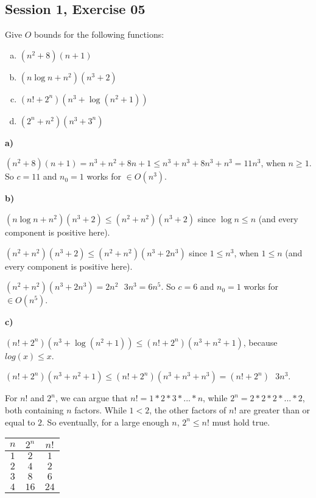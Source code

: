 \subsection{Session 1, Exercise 05}


Give $O$ bounds for the following functions:

\begin{enumerate}[a.)]
    \item $(n^2+8)(n+1)$
    \item $(n\log{n} + n^2)(n^3+2)$
    \item $(n!+2^n)(n^3+\log(n^2+1))$
    \item $(2^n+n^2)(n^3+3^n)$
\end{enumerate}


\textbf{a)}

$(n^2+8)(n+1) = n^3+n^2+8n+1 \leq{} n^3 + n^3 + 8n^3 + n^3 = 11n^3$, when $n\geq{}1$. So $c=11$ and $n_0=1$ works for $\in{}O(n^3)$.

\textbf{b)}

$(n\log{n} + n^2)(n^3+2) \leq{} (n^2 + n^2)(n^3+2)$ since $\log{n} \leq{} n$ (and every component is positive here).

$(n^2 + n^2)(n^3+2) \leq{} (n^2 + n^2)(n^3+2n^3)$ since $1 \leq{} n^3$, when $1 \leq{} n$ (and every component is positive here).

$(n^2 + n^2)(n^3+2n^3) = 2n^2\text{ }3n^3 = 6n^5$. So $c=6$ and $n_0=1$ works for $\in{}O(n^5)$.

\textbf{c)}

$(n!+2^n)(n^3+\log(n^2+1)) \leq{} (n!+2^n)(n^3+n^2+1)$, because $log(x) \leq{} x$.

$(n!+2^n)(n^3+n^2+1) \leq{} (n!+2^n)(n^3+n^3+n^3) = (n!+2^n)\text{ }3n^3$.

For $n!$ and $2^n$, we can argue that $n! = 1*2*3*...*n$, while $2^n=2*2*2*...*2$, both containing $n$ factors. While $1<2$, the other factors of $n!$ are greater than or equal to $2$. So eventually, for a large enough $n$, $2^n \leq{} n!$ must hold true.

\begin{tabular}{c|c|c}
$n$ & $2^n$ & $n!$ \\ \hline
$1$ & $2$ & $1$ \\
$2$ & $4$ & $2$ \\
$3$ & $8$ & $6$ \\
$4$ & $16$ & $24$ \\
\end{tabular}

